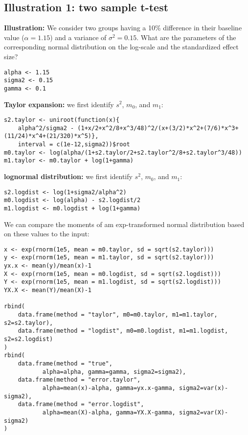 \documentclass[12pt]{article}
\begin{document}
\subsection{Illustration 1: two sample t-test}
\label{sec:org6a59369}

\textbf{Illustration:} We consider two groups having a 10\% difference
in their baseline value (\(\alpha=1.15\)) and a variance of \(\sigma^2
= 0.15\). What are the parameters of the corresponding normal
distribution on the log-scale and the standardized effect size?
\lstset{language=r,label= ,caption= ,captionpos=b,numbers=none}
\begin{lstlisting}
alpha <- 1.15
sigma2 <- 0.15
gamma <- 0.1
\end{lstlisting}

\textbf{Taylor expansion:} we first identify \(s^2\), \(m_0\), and
\(m_1\):
\lstset{language=r,label= ,caption= ,captionpos=b,numbers=none}
\begin{lstlisting}
s2.taylor <- uniroot(function(x){
    alpha^2/sigma2 - (1+x/2+x^2/8+x^3/48)^2/(x+(3/2)*x^2+(7/6)*x^3+(11/24)*x^4+(21/320)*x^5)},
    interval = c(1e-12,sigma2))$root
m0.taylor <- log(alpha/(1+s2.taylor/2+s2.taylor^2/8+s2.taylor^3/48))
m1.taylor <- m0.taylor + log(1+gamma)
\end{lstlisting}

\textbf{lognormal distribution:} we first identify \(s^2\), \(m_0\),
and \(m_1\):
\lstset{language=r,label= ,caption= ,captionpos=b,numbers=none}
\begin{lstlisting}
s2.logdist <- log(1+sigma2/alpha^2)
m0.logdist <- log(alpha) - s2.logdist/2
m1.logdist <- m0.logdist + log(1+gamma)
\end{lstlisting}

We can compare the moments of am exp-transformed normal distribution
based on these values to the input:
\lstset{language=r,label= ,caption= ,captionpos=b,numbers=none}
\begin{lstlisting}
x <- exp(rnorm(1e5, mean = m0.taylor, sd = sqrt(s2.taylor)))
y <- exp(rnorm(1e5, mean = m1.taylor, sd = sqrt(s2.taylor)))
yx.x <- mean(y)/mean(x)-1
X <- exp(rnorm(1e5, mean = m0.logdist, sd = sqrt(s2.logdist)))
Y <- exp(rnorm(1e5, mean = m1.logdist, sd = sqrt(s2.logdist)))
YX.X <- mean(Y)/mean(X)-1

rbind(
    data.frame(method = "taylor", m0=m0.taylor, m1=m1.taylor, s2=s2.taylor), 
    data.frame(method = "logdist", m0=m0.logdist, m1=m1.logdist, s2=s2.logdist)
)
rbind(
    data.frame(method = "true", 
	       alpha=alpha, gamma=gamma, sigma2=sigma2), 
    data.frame(method = "error.taylor", 
	       alpha=mean(x)-alpha, gamma=yx.x-gamma, sigma2=var(x)-sigma2),
    data.frame(method = "error.logdist", 
	       alpha=mean(X)-alpha, gamma=YX.X-gamma, sigma2=var(X)-sigma2)
)
\end{lstlisting}
\end{document}
